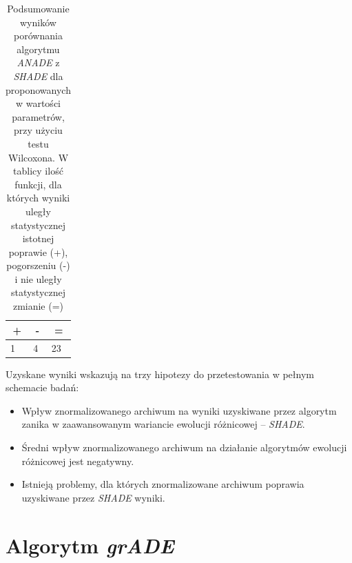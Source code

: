 \documentclass[12pt,a4paper]{report}
\begin{document}
{{{{{{\begin{table}[h]
\centering
\caption{Podsumowanie wyników porównania algorytmu \emph{ANADE} z \emph{SHADE} dla proponowanych w \cite{SHADE} wartości parametrów, przy użyciu testu Wilcoxona. W tablicy ilość funkcji, dla których wyniki uległy statystycznej istotnej poprawie (+), pogorszeniu (-) i nie uległy statystycznej zmianie (=)}
\label{Eksp3short}
\begin{tabular}{|l|l|l|}
\hline
\multicolumn{1}{c|}{{\bf +}} & \multicolumn{1}{c|}{{\bf -}} & \multicolumn{1}{c|}{{\bf =}} \\ \hline
1       & 4       & 23      \\ \hline
\end{tabular}
\end{table}

\par{
Uzyskane wyniki wskazują na trzy hipotezy do przetestowania w pełnym schemacie badań:
\begin{itemize}
\item Wpływ znormalizowanego archiwum na wyniki uzyskiwane przez algorytm zanika w zaawansowanym wariancie ewolucji różnicowej -- \emph{SHADE}.
\item Średni wpływ znormalizowanego archiwum na działanie algorytmów ewolucji różnicowej jest negatywny.
\item Istnieją problemy, dla których znormalizowane archiwum poprawia uzyskiwane przez \emph{SHADE} wyniki.
\end{itemize}
}

\section{Algorytm \emph{grADE}}
}}}}}}
\end{document}
